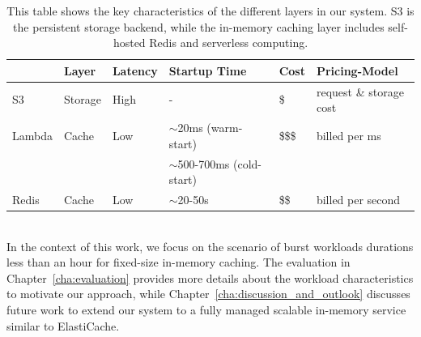 \begin{table}[t]
    \centering
        \begin{tabular}{ @{}l l l l l l@{} }
        \toprule
          & Layer & Latency & Startup Time & Cost & Pricing-Model \\
        \midrule
        S3 & Storage & High & - & \$ & request \& storage cost \\
        Lambda & Cache & Low & $\sim$20ms (warm-start) & \$\$\$ & billed per ms \\
         & & & $\sim$500-700ms (cold-start) & & \\
        Redis & Cache & Low & $\sim$20-50s & \$\$ & billed per second \\
        \bottomrule
        \end{tabular}
    \caption{This table shows the key characteristics of the different layers in our system. S3 is the persistent storage backend, while the in-memory caching layer includes self-hosted Redis and serverless computing.}
    \label{tab:layers}
\end{table}

~\\
In the context of this work, we focus on the scenario of burst workloads durations less than an hour for fixed-size in-memory caching. The evaluation in Chapter~\ref{cha:evaluation} provides more details about the workload characteristics to motivate our approach, while Chapter~\ref{cha:discussion_and_outlook} discusses future work to extend our system to a fully managed scalable in-memory service similar to ElastiCache.



